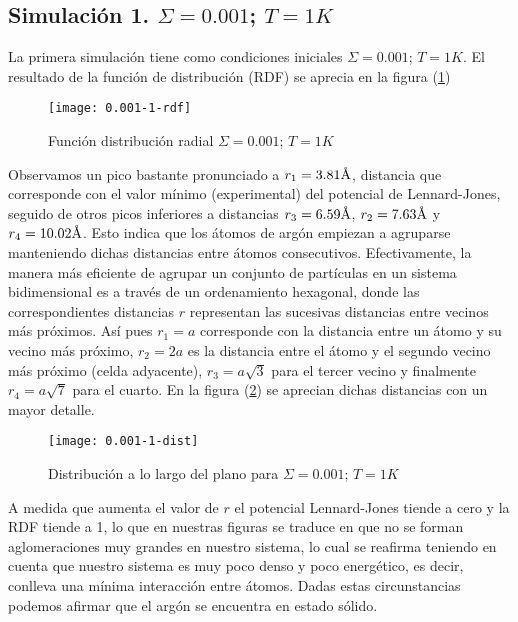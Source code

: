 \subsection{Simulación 1. $\Sigma=0.001$; $T=1K$}

La primera simulación tiene como condiciones iniciales $\Sigma=0.001$; $T=1K$. El resultado de la función de distribución (RDF) se aprecia en la figura (\ref{rdf_0.001_1})

\begin{figure}[t]
	\texttt{[image: 0.001-1-rdf]}
	\caption{Función distribución radial $\Sigma=0.001$; $T=1K$}
	\label{rdf_0.001_1}
\end{figure}

Observamos un pico bastante pronunciado a $r_{1} = 3.81 \textup{\r{A}}$, distancia que corresponde con el valor mínimo (experimental) del potencial de Lennard-Jones, seguido de otros picos inferiores a distancias $r_{3} = 6.59 \textup{\r{A}}$, $r_{2} = 7.63 \textup{\r{A}}$ y $r_{4} = 10.02 \textup{\r{A}}$. Esto indica que los átomos de argón empiezan a agruparse manteniendo dichas distancias entre átomos consecutivos. Efectivamente, la manera más eficiente de agrupar un conjunto de partículas en un sistema bidimensional es a través de un ordenamiento hexagonal, donde las correspondientes distancias $r$ representan las sucesivas distancias entre vecinos más próximos. Así pues $r_{1}=a$ corresponde con la distancia entre un átomo y su vecino más próximo, $r_{2} = 2a$ es la distancia entre el átomo y el segundo vecino más próximo (celda adyacente), $r_{3} = a \sqrt{3}$ para el tercer vecino y finalmente $r_{4}= a\sqrt{7}$ para el cuarto. En la figura (\ref{dist_0.001_1}) se aprecian dichas distancias con un mayor detalle.

\begin{figure}[t]
	\texttt{[image: 0.001-1-dist]}
	\caption{Distribución a lo largo del plano para $\Sigma=0.001$; $T=1K$}
	\label{dist_0.001_1}
\end{figure}

A medida que aumenta el valor de $r$ el potencial Lennard-Jones tiende a cero y la RDF tiende a 1, lo que en nuestras figuras se traduce en que no se forman aglomeraciones muy grandes en nuestro sistema, lo cual se reafirma teniendo en cuenta que nuestro sistema es muy poco denso y poco energético, es decir, conlleva una mínima interacción entre átomos. Dadas estas circunstancias podemos afirmar que el argón se encuentra en estado sólido.

